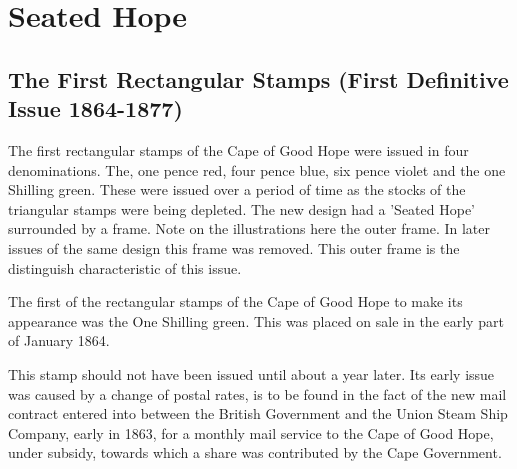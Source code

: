 \chapter{Seated Hope} 

\section{The First Rectangular Stamps (First Definitive Issue 1864-1877)}

The first rectangular stamps of the Cape of Good Hope were issued 
in four denominations. The, one pence red, four pence blue, 
six pence violet and the one Shilling green. These were issued 
over a period of time as the stocks of the triangular stamps were 
being depleted. The new design had a 'Seated Hope' surrounded by a frame. 
Note on the illustrations here the outer frame. In later issues of the 
same design this frame was removed. This outer frame is the distinguish 
characteristic of this issue.






The first of the rectangular stamps of the Cape of Good Hope to make 
its appearance was the One Shilling green. This was placed on sale in 
the early part of January 1864.

This stamp should not have been issued until about a year later. 
Its early issue was caused by a change of postal rates,  is to be 
found in the fact of the new mail contract entered into between the 
British Government and the Union Steam Ship Company, early in 1863, 
for a monthly mail service to the Cape of Good Hope, under subsidy, 
towards which a share was contributed by the Cape Government.


 
 

